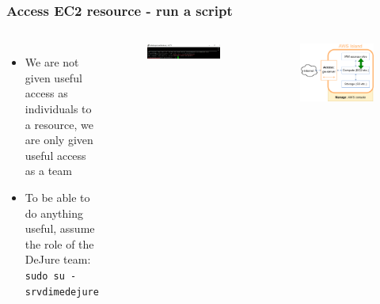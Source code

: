\documentclass[aspectratio=169]{beamer} %
\newcommand{\teamName}{DeJure }
\newcommand{\srvAcctName}{srvdimedejure}
\begin{document}
\begin{frame}
	\frametitle{Access EC2 resource - run a script}
	\begin{columns}[c]
		\begin{itemize}
			\item We are not given useful access as individuals to a resource,
			 we are only given useful access as a team
			\item To be able to do anything useful,
			assume the role of the \teamName team: \newline
			\texttt{sudo su - \srvAcctName}
		\end{itemize}

		\begin{figure}
			\centering
			\includegraphics[width=\textwidth]{./img/access-4.png}
		\end{figure}

		\begin{figure}
			\centering
			\includegraphics[width=\textwidth]{./img/wb-aws-iam.png}
		\end{figure}

	\end{columns}
\end{frame}
\end{document}
